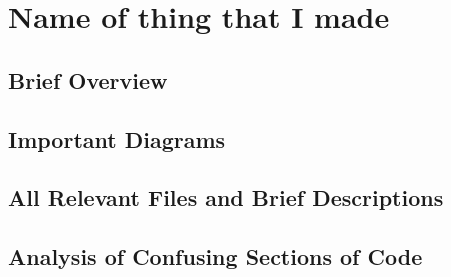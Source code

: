 \section{Name of thing that I made}

\subsection{Brief Overview}


\subsection{Important Diagrams}


\subsection{All Relevant Files and Brief Descriptions}


\subsection{Analysis of Confusing Sections of Code}

